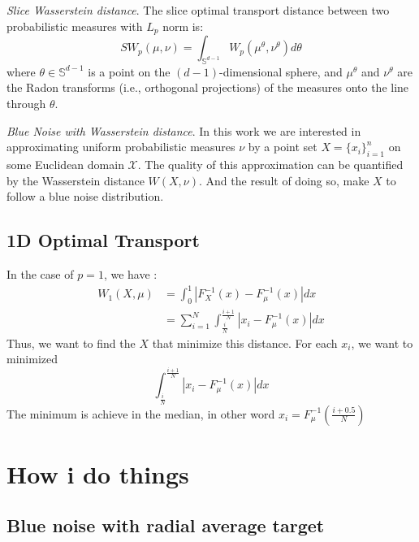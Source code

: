 \documentclass{classeENS}
\begin{document}
\> \textit{Slice Wasserstein distance}. The slice optimal transport distance 
    between two probabilistic measures with $L_p$ norm is:
    \[SW_p(\mu, \nu) = \int_{\mathbb{S}^{d-1}} W_p(\mu^\theta,\nu^\theta) d\theta\]
    where $\theta \in \mathbb{S}^{d-1}$ is a point on the $(d-1)$-dimensional sphere, 
    and $\mu^\theta$ and $\nu^\theta$ are the Radon transforms (i.e., orthogonal 
    projections) of the measures onto the line through $\theta$.


\> \textit{Blue Noise with Wasserstein distance}. In this work we are 
    interested in approximating uniform probabilistic measures $\nu$ by a 
    point set $X = \{x_i\}_{i=1}^n$ on some Euclidean domain $\mathcal X$. 
    The quality of this approximation can be quantified by the Wasserstein 
    distance $W(X, \nu)$. 
    And the result of doing so, make $X$ to follow a blue noise distribution.

\subsection{1D Optimal Transport}
\noindent In the case of $p=1$, we have :
\begin{align*}
    W_1(X,\mu) &= \int_0^1 |F_X^{-1}(x) - F_\mu^{-1}(x)| dx \\
               &= \sum_{i=1}^N \int_{\frac{i}{N}}^{\frac{i+1}{N}} |x_i - F_\mu^{-1}(x)| dx
\end{align*}
Thus, we want to find the $X$ that minimize this distance. For each $x_i$, we want to minimized
\[ \int_{\frac{i}{N}}^{\frac{i+1}{N}} |x_i - F_\mu^{-1}(x)| dx \]
The minimum is achieve in the median, in other word $x_i = F_\mu^{-1}\left (\frac{i+0.5}{N} \right )$


\section{How i do things}

\subsection{Blue noise with radial average target}
\end{document}
